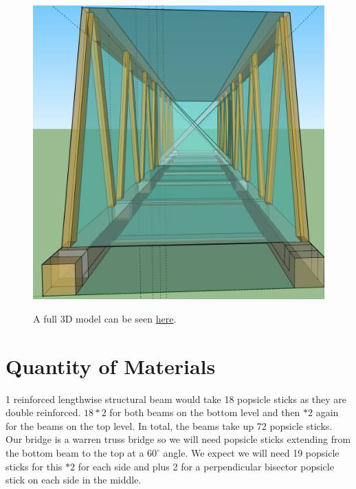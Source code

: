 \documentclass[paper=a4, fontsize=11pt]{scrartcl}
\numberwithin{equation}{section}		%
\numberwithin{figure}{section}			%
\numberwithin{table}{section}				%
\begin{document}
\begin{figure}[h!]
\begin{center}
\begin{minipage}{0.2\textwidth}
        \end{minipage}
        \begin{minipage}{0.2\textwidth}
            \includegraphics[width=\textwidth]{Model4}
        \end{minipage}
        \small A full 3D model can be seen \href{https://edu.sketchup.com/edit/drive?state=%7B%22ids%22:%5B%221yB8N-bXuZJSEG8IIjcsYNLarOb2QExoJ%22%5D,%22action%22:%22open%22,%22userId%22:%22102245663458466828255%22%7D}{here}.
    \end{center}
\end{figure}
\section{Quantity of Materials}

1 reinforced lengthwise structural beam would take 18 popsicle sticks as they are double reinforced. $18*2$ for both beams on the bottom level and then $*2$ again for the beams on the top level. In total, the beams take up 72 popsicle sticks. Our bridge is a warren truss bridge so we will need popsicle sticks extending from the bottom beam to the top at a $60^{\circ}$ angle. We expect we will need 19 popsicle sticks for this $*2$ for each side and plus 2 for a perpendicular bisector popsicle stick on each side in the middle. 
\end{document}
